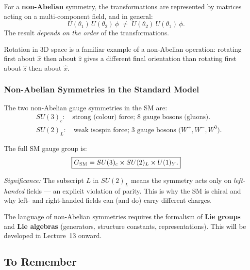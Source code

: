 \documentclass[../main.tex]{subfiles}
\begin{document}
For a \textbf{non-Abelian} symmetry, the transformations are represented by matrices acting on a multi-component field, and in general:
\begin{equation}
  \boxed{
  U(\theta_1)\,U(\theta_2)\,\phi
  \;\neq\;
  U(\theta_2)\,U(\theta_1)\,\phi.}
  \label{eq:lec12:nonabelian}
\end{equation}
The result \emph{depends on the order} of the transformations.

\begin{remark}
  Rotation in 3D space is a familiar example of a non-Abelian operation: rotating first about $\hat{x}$ then about $\hat{z}$ gives a different final orientation than rotating first about $\hat{z}$ then about $\hat{x}$.
\end{remark}

\subsubsection*{Non-Abelian Symmetries in the Standard Model}

The two non-Abelian gauge symmetries in the SM are:
\begin{align}
  &SU(3)_c: \quad\text{strong (colour) force; 8 gauge bosons (gluons).}
  \label{eq:lec12:su3}\\
  &SU(2)_L: \quad\text{weak isospin force; 3 gauge bosons ($W^+,W^-,W^0$).}
  \label{eq:lec12:su2}
\end{align}

The full SM gauge group is:
\begin{equation}
  \boxed{G_{\rm SM} = SU(3)_c \times SU(2)_L \times U(1)_Y.}
  \label{eq:lec12:smgroup}
\end{equation}

\textit{Significance:} The subscript $L$ in $SU(2)_L$ means the symmetry acts only on \emph{left-handed} fields — an explicit violation of parity.  This is why the SM is chiral and why left- and right-handed fields can (and do) carry different charges.

The language of non-Abelian symmetries requires the formalism of \textbf{Lie groups} and \textbf{Lie algebras} (generators, structure constants, representations).  This will be developed in Lecture~13 onward.

\subsection*{To Remember}
\end{document}

